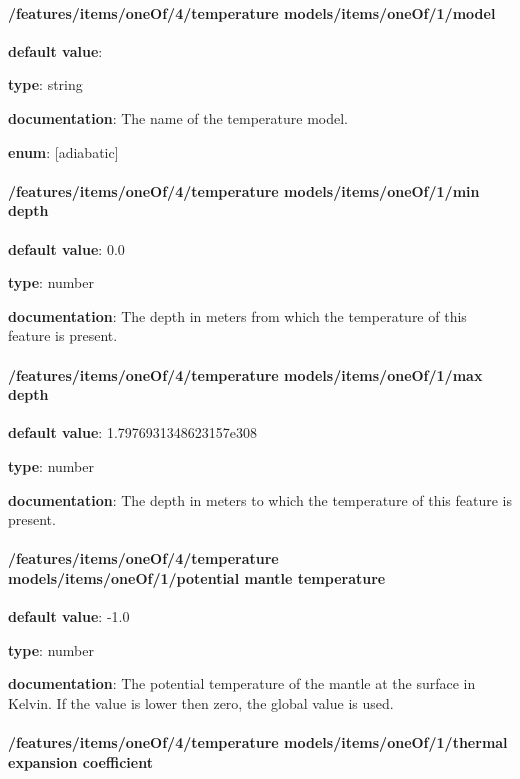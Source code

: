 \paragraph{/features/items/oneOf/4/temperature models/items/oneOf/1/model} \begin{itemized}
\item {\bf default value}: 
\item {\bf type}: string
\item {\bf documentation}: The name of the temperature model.
\item {\bf enum}: [adiabatic]\end{itemized}\paragraph{/features/items/oneOf/4/temperature models/items/oneOf/1/min depth} \begin{itemized}
\item {\bf default value}: 0.0
\item {\bf type}: number
\item {\bf documentation}: The depth in meters from which the temperature of this feature is present.
\end{itemized}\paragraph{/features/items/oneOf/4/temperature models/items/oneOf/1/max depth} \begin{itemized}
\item {\bf default value}: 1.7976931348623157e308
\item {\bf type}: number
\item {\bf documentation}: The depth in meters to which the temperature of this feature is present.
\end{itemized}\paragraph{/features/items/oneOf/4/temperature models/items/oneOf/1/potential mantle temperature} \begin{itemized}
\item {\bf default value}: -1.0
\item {\bf type}: number
\item {\bf documentation}: The potential temperature of the mantle at the surface in Kelvin. If the value is lower then zero, the global value is used.
\end{itemized}\paragraph{/features/items/oneOf/4/temperature models/items/oneOf/1/thermal expansion coefficient} \begin{itemized}

\end{itemized}
